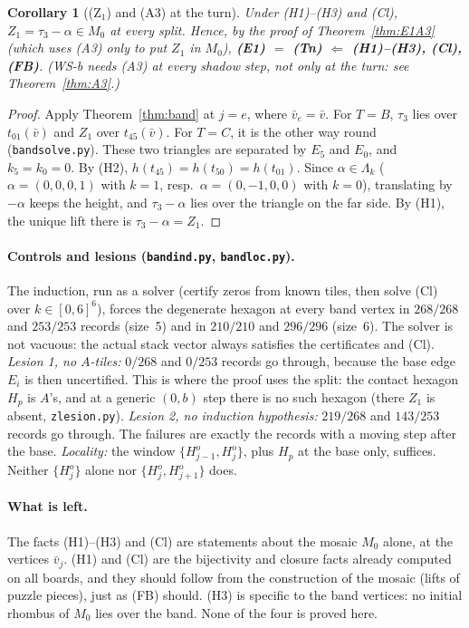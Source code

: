 \documentclass[11pt]{article}
\newtheorem{corollary}[theorem]{Corollary}
\theoremstyle{definition}\newtheorem{definition}[theorem]{Definition}\newtheorem{remark}[theorem]{Remark}
\begin{document}
\begin{corollary}[(Z$_1$) and (A3) at the turn]\label{cor:A3turn}
Under (H1)--(H3) and (Cl), $Z_1=\tau_3-\alpha\in M_0$ at every split. Hence, by the proof of Theorem~\ref{thm:E1A3} (which uses (A3) only to put $Z_1$ in $M_0$), \textbf{(E1) $=$ (Tn) $\Leftarrow$ (H1)--(H3), (Cl), (FB)}. (WS-b needs (A3) at every shadow step, not only at the turn: see Theorem~\ref{thm:A3}.)
\end{corollary}
\begin{proof}
Apply Theorem~\ref{thm:band} at $j=e$, where $\bar v_e=\bar v$. For $T=B$, $\tau_3$ lies over $t_{01}(\bar v)$ and $Z_1$ over $t_{45}(\bar v)$. For $T=C$, it is the other way round (\texttt{bandsolve.py}). These two triangles are separated by $E_5$ and $E_0$, and $k_5=k_0=0$. By (H2), $h(t_{45})=h(t_{50})=h(t_{01})$. Since $\alpha\in\Lambda_k$ ($\alpha=(0,0,0,1)$ with $k=1$, resp.\ $\alpha=(0,-1,0,0)$ with $k=0$), translating by $-\alpha$ keeps the height, and $\tau_3-\alpha$ lies over the triangle on the far side. By (H1), the unique lift there is $\tau_3-\alpha=Z_1$.
\end{proof}

\paragraph{Controls and lesions (\texttt{bandind.py}, \texttt{bandloc.py}).} The induction, run as a solver (certify zeros from known tiles, then solve (Cl) over $k\in[0,6]^6$), forces the degenerate hexagon at every band vertex in $268/268$ and $253/253$ records (size~5) and in $210/210$ and $296/296$ (size~6). The solver is not vacuous: the actual stack vector always satisfies the certificates and (Cl). \emph{Lesion 1, no $A$-tiles:} $0/268$ and $0/253$ records go through, because the base edge $E_i$ is then uncertified. This is where the proof uses the split: the contact hexagon $H_p$ is $A$'s, and at a generic $(0,b)$ step there is no such hexagon (there $Z_1$ is absent, \texttt{zlesion.py}). \emph{Lesion 2, no induction hypothesis:} $219/268$ and $143/253$ records go through. The failures are exactly the records with a moving step after the base. \emph{Locality:} the window $\{H^o_{j-1},H^o_j\}$, plus $H_p$ at the base only, suffices. Neither $\{H^o_j\}$ alone nor $\{H^o_j,H^o_{j+1}\}$ does.

\paragraph{What is left.} The facts (H1)--(H3) and (Cl) are statements about the mosaic $M_0$ alone, at the vertices $\bar v_j$. (H1) and (Cl) are the bijectivity and closure facts already computed on all boards, and they should follow from the construction of the mosaic (lifts of puzzle pieces), just as (FB) should. (H3) is specific to the band vertices: no initial rhombus of $M_0$ lies over the band. None of the four is proved here.
\end{document}
